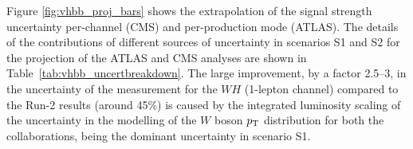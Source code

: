 

Figure \ref{fig:vhbb_proj_bars} shows the extrapolation of the signal strength uncertainty per-channel (CMS) and per-production mode (ATLAS). The details of the contributions of different sources of uncertainty in scenarios S1 and S2 for the projection of the ATLAS and CMS analyses are shown in Table~\ref{tab:vhbb_uncertbreakdown}.
The large improvement, by a factor 2.5--3, in the uncertainty of the measurement for the $WH$ (1-lepton channel) compared to the Run-2 results (around 45\%) is caused by the integrated luminosity scaling of the uncertainty in the modelling of the $W$ boson $p\sb{\scriptstyle\mathrm{T}}$ distribution for both the collaborations, being the dominant uncertainty in scenario S1.

